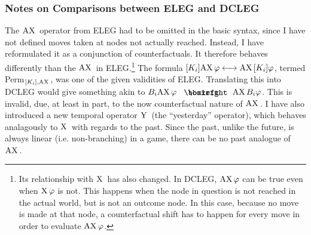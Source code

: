 \documentclass{article}
\begin{document}
\subsubsection{Notes on Comparisons between ELEG and DCLEG}
The $\text{AX}\,$ operator from ELEG had to be omitted in the basic syntax, since I have not defined moves taken at nodes not actually reached. Instead, I have reformulated it as a conjunction of counterfactuals. It therefore behaves differently than the $\text{AX}\,$ in ELEG.\footnote{Its relationship with $\text{X}\,$ has also changed. In DCLEG, $\text{AX}\,\varphi$ can be true even when $\text{X}\,\varphi$ is not. This happens when the node in question is not reached in the actual world, but is not an outcome node. In this case, because no move is made at that node, a counterfactual shift has to happen for every move in order to evaluate $\text{AX}\,\varphi$.} The formula $[K_i]\text{AX}\,\varphi\longleftrightarrow\text{AX}\,[K_i]\varphi$, termed Perm$_{[K_i],\text{AX}\,}$, was one of the given validities of ELEG. Translating this into DCLEG would give something akin to $B_i\AX\varphi\boxiff\AX B_i\varphi$. This is invalid, due, at least in part, to the now counterfactual nature of $\text{AX}\,$. I have also introduced a new temporal operator $\text{Y}\,$ (the ``yesterday'' operator), which behaves analagously to $\text{X}\,$ with regards to the past. Since the past, unlike the future, is always linear (i.e. non-branching) in a game, there can be no past analogue of $\text{AX}\,$.
\end{document}
